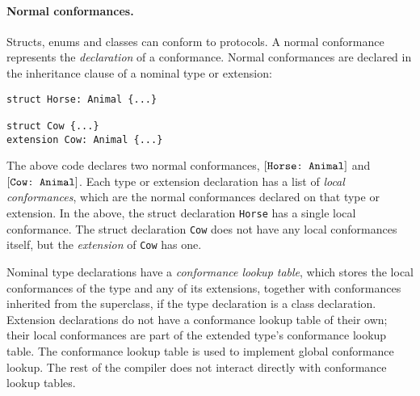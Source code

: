\documentclass[../generics]{subfiles}
\begin{document}
%
%
%
%
%
\paragraph{Normal conformances.} Structs, enums and classes can conform to protocols. A normal conformance represents the \emph{declaration} of a conformance. Normal conformances are declared in the inheritance clause of a nominal type or extension:
\begin{Verbatim}
struct Horse: Animal {...}

struct Cow {...}
extension Cow: Animal {...}
\end{Verbatim}
The above code declares two normal conformances, $[\texttt{Horse:~Animal}]$ and $[\texttt{Cow:~Animal}]$.
Each type or extension declaration has a list of \emph{local conformances}, which are the normal conformances declared on that type or extension. In the above, the struct declaration \texttt{Horse} has a single local conformance. The struct declaration \texttt{Cow} does not have any local conformances itself, but the \emph{extension} of \texttt{Cow} has one. 

Nominal type declarations have a \emph{conformance lookup table}, which stores the local conformances of the type and any of its extensions, together with conformances inherited from the superclass, if the type declaration is a class declaration. Extension declarations do not have a conformance lookup table of their own; their local conformances are part of the extended type's conformance lookup table. The conformance lookup table is used to implement global conformance lookup. The rest of the compiler does not interact directly with conformance lookup tables.
\end{document}
